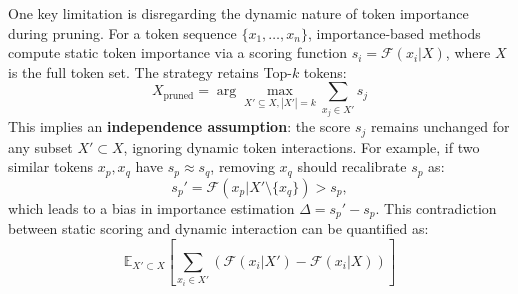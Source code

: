One key limitation is disregarding the dynamic nature of token importance during pruning.
For a token sequence \(\{x_1, \ldots, x_n\}\), importance-based methods compute static token importance via a scoring function \(s_i = \mathcal{F}(x_i | X)\), where \(X\) is the full token set. The strategy retains Top-\(k\) tokens:
\begin{equation}
    X_{\text{pruned}} = \arg \max_{X' \subseteq X, |X'| = k} \sum_{x_j \in X'} s_j
\end{equation}
This implies an \textbf{independence assumption}: the score \( s_j \) remains unchanged for any subset \( X' \subset X \), ignoring dynamic token interactions. For example, if two similar tokens \( x_p, x_q \) have \( s_p \approx s_q \), removing \( x_q \) should recalibrate \( s_p \) as:
\begin{equation}
    s_p' = \mathcal{F}(x_p | X' \setminus \{x_q\}) > s_p,
\end{equation}
which leads to a bias in importance estimation \(\Delta = s_p' - s_p\). This contradiction between static scoring and dynamic interaction can be quantified as:
\begin{equation}
    \mathbb{E}_{X' \subset X} \left[ \sum_{x_i \in X'} \left( \mathcal{F}(x_i | X') - \mathcal{F}(x_i | X) \right) \right]
\end{equation}


